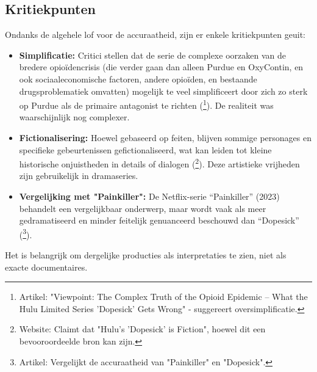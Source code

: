 \documentclass[11pt, a4paper]{report} %
\begin{document}
\subsection{Kritiekpunten}
Ondanks de algehele lof voor de accuraatheid, zijn er enkele kritiekpunten geuit:
\begin{itemize}
    \item \textbf{Simplificatie:} Critici stellen dat de serie de complexe oorzaken van de bredere opioïdencrisis (die verder gaan dan alleen Purdue en OxyContin, en ook sociaaleconomische factoren, andere opioïden, en bestaande drugsproblematiek omvatten) mogelijk te veel simplificeert door zich zo sterk op Purdue als de primaire antagonist te richten (\cite{RGRDLawComplexTruth}\footnote{Artikel: "Viewpoint: The Complex Truth of the Opioid Epidemic – What the Hulu Limited Series 'Dopesick' Gets Wrong" - suggereert oversimplificatie.}). De realiteit was waarschijnlijk nog complexer.
    \item \textbf{Fictionalisering:} Hoewel gebaseerd op feiten, blijven sommige personages en specifieke gebeurtenissen gefictionaliseerd, wat kan leiden tot kleine historische onjuistheden in details of dialogen (\cite{JudgeForYourselvesDopesickFiction}\footnote{Website: Claimt dat "Hulu’s 'Dopesick' is Fiction", hoewel dit een bevooroordeelde bron kan zijn.}). Deze artistieke vrijheden zijn gebruikelijk in dramaseries.
    \item \textbf{Vergelijking met "Painkiller":} De Netflix-serie \enquote{Painkiller} (2023) behandelt een vergelijkbaar onderwerp, maar wordt vaak als meer gedramatiseerd en minder feitelijk genuanceerd beschouwd dan \enquote{Dopesick} (\cite{ScreenrantPainkillerVsDopesick}\footnote{Artikel: Vergelijkt de accuraatheid van "Painkiller" en "Dopesick".}).
\end{itemize}
Het is belangrijk om dergelijke producties als interpretaties te zien, niet als exacte documentaires.
\end{document}
